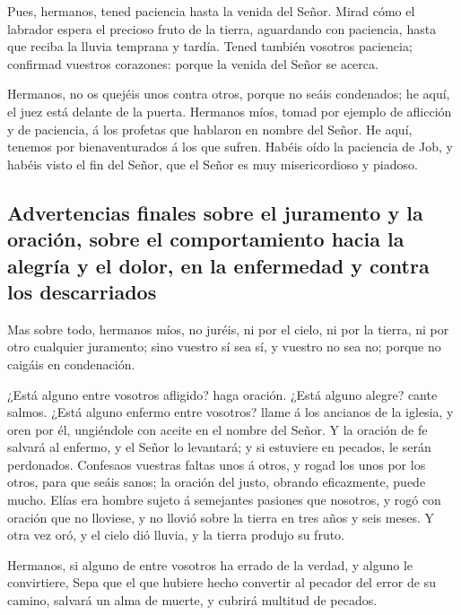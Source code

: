  Pues, hermanos, tened paciencia hasta la venida del
Señor. Mirad cómo el labrador espera el precioso fruto de la tierra,
aguardando con paciencia, hasta que reciba la lluvia temprana y tardía.
 Tened también vosotros paciencia; confirmad vuestros
corazones: porque la venida del Señor se acerca.

 Hermanos, no os quejéis unos contra otros, porque no
seáis condenados; he aquí, el juez está delante de la puerta.
 Hermanos míos, tomad por ejemplo de aflicción y de
paciencia, á los profetas que hablaron en nombre del Señor.
 He aquí, tenemos por bienaventurados á los que sufren.
Habéis oído la paciencia de Job, y habéis visto el fin del Señor, que el
Señor es muy misericordioso y piadoso.

\hypertarget{advertencias-finales-sobre-el-juramento-y-la-oraciuxf3n-sobre-el-comportamiento-hacia-la-alegruxeda-y-el-dolor-en-la-enfermedad-y-contra-los-descarriados}{%
\subsection{Advertencias finales sobre el juramento y la oración, sobre
el comportamiento hacia la alegría y el dolor, en la enfermedad y contra
los
descarriados}\label{advertencias-finales-sobre-el-juramento-y-la-oraciuxf3n-sobre-el-comportamiento-hacia-la-alegruxeda-y-el-dolor-en-la-enfermedad-y-contra-los-descarriados}}

 Mas sobre todo, hermanos míos, no juréis, ni por el
cielo, ni por la tierra, ni por otro cualquier juramento; sino vuestro
sí sea sí, y vuestro no sea no; porque no caigáis en condenación.

 ¿Está alguno entre vosotros afligido? haga oración.
¿Está alguno alegre? cante salmos.  ¿Está alguno enfermo
entre vosotros? llame á los ancianos de la iglesia, y oren por él,
ungiéndole con aceite en el nombre del Señor.  Y la
oración de fe salvará al enfermo, y el Señor lo levantará; y si
estuviere en pecados, le serán perdonados.  Confesaos
vuestras faltas unos á otros, y rogad los unos por los otros, para que
seáis sanos; la oración del justo, obrando eficazmente, puede mucho.
 Elías era hombre sujeto á semejantes pasiones que
nosotros, y rogó con oración que no lloviese, y no llovió sobre la
tierra en tres años y seis meses.  Y otra vez oró, y el
cielo dió lluvia, y la tierra produjo su fruto.

 Hermanos, si alguno de entre vosotros ha errado de la
verdad, y alguno le convirtiere,  Sepa que el que hubiere
hecho convertir al pecador del error de su camino, salvará un alma de
muerte, y cubrirá multitud de pecados.
